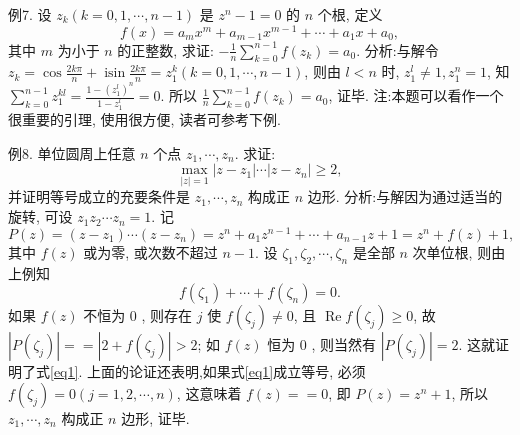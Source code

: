 例7. 设 $z_k(k=0,1, \cdots, n-1)$ 是 $z^n-1=0$ 的 $n$ 个根, 定义
$$
f(x)=a_m x^m+a_{m-1} x^{m-1}+\cdots+a_1 x+a_0,
$$
其中 $m$ 为小于 $n$ 的正整数, 求证: $-\frac{1}{n} \sum_{k=0}^{n-1} f\left(z_k\right)=a_0$.
分析:与解令 $z_k=\cos \frac{2 k \pi}{n}+\operatorname{isin} \frac{2 k \pi}{n}=z_1^k(k=0,1, \cdots, n-1)$,
则由 $l<n$ 时, $z_1^l \neq 1, z_1^n=1$, 知 $\sum_{k=0}^{n-1} z_1^{k l}=\frac{1-\left(z_1^l\right)^n}{1-z_1^l}=0$.
所以 $\frac{1}{n} \sum_{k=0}^{n-1} f\left(z_k\right)=a_0$, 证毕.
注:本题可以看作一个很重要的引理, 使用很方便, 读者可参考下例.



例8. 单位圆周上任意 $n$ 个点 $z_1, \cdots, z_n$. 求证:
$$
\max _{|z|=1}\left|z-z_1\right| \cdots\left|z-z_n\right| \geqslant 2, \label{eq1}
$$
并证明等号成立的充要条件是 $z_1, \cdots, z_n$ 构成正 $n$ 边形.
分析:与解因为通过适当的旋转, 可设 $z_1 z_2 \cdots z_n=1$. 记
$$
P(z)=\left(z-z_1\right) \cdots\left(z-z_n\right)=z^n+a_1 z^{n-1}+\cdots+a_{n-1} z+1=z^n+f(z)+1,
$$
其中 $f(z)$ 或为零, 或次数不超过 $n-1$. 设 $\zeta_1, \zeta_2, \cdots, \zeta_n$ 是全部 $n$ 次单位根, 则由上例知
$$
f\left(\zeta_1\right)+\cdots+f\left(\zeta_n\right)=0 .
$$
如果 $f(z)$ 不恒为 0 , 则存在 $j$ 使 $f\left(\zeta_j\right) \neq 0$, 且 $\operatorname{Re} f\left(\zeta_j\right) \geqslant 0$, 故 $\left|P\left(\zeta_j\right)\right|== \left|2+f\left(\zeta_j\right)\right|>2$; 如 $f(z)$ 恒为 0 , 则当然有 $\left|P\left(\zeta_j\right)\right|=2$. 这就证明了式\ref{eq1}.
上面的论证还表明,如果式\ref{eq1}成立等号, 必须 $f\left(\zeta_j\right)=0(j=1,2, \cdots, n)$, 这意味着 $f(z)==0$, 即 $P(z)=z^n+1$, 所以 $z_1, \cdots, z_n$ 构成正 $n$ 边形, 证毕.


